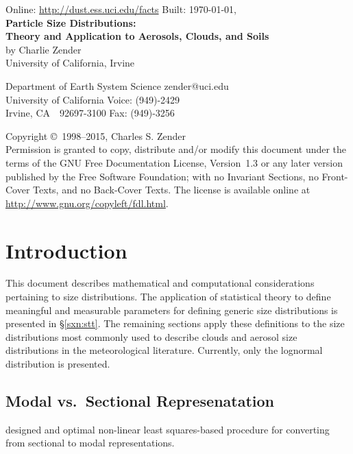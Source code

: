 \documentclass[12pt,twoside]{article}
\begin{document}

\begin{center}
Online: \url{http://dust.ess.uci.edu/facts} \hfill Built: \shortdate\today, \xxivtime\\
\bigskip
{\Large \textbf{Particle Size Distributions:\\ 
Theory and Application to Aerosols, Clouds, and Soils}}\\
\bigskip
by Charlie Zender\\
University of California, Irvine\\
\end{center}
Department of Earth System Science \hfill zender@uci.edu\\
University of California \hfill Voice: (949)-2429\\
Irvine, CA~~92697-3100 \hfill Fax: (949)-3256

\bigskip\noindent
Copyright \copyright\ 1998--2015,  Charles S. Zender\\
Permission is granted to copy, distribute and/or modify this document
under the terms of the GNU Free Documentation License, Version~1.3
or any later version published by the Free Software Foundation;
with no Invariant Sections, no Front-Cover Texts, and no Back-Cover
Texts.
The license is available online at
\url{http://www.gnu.org/copyleft/fdl.html}.

\setcounter{page}{1}
\pagestyle{headings}
\thispagestyle{empty}
\tableofcontents
\listoftables
{}
\setcounter{page}{1}
\thispagestyle{empty}

\section{Introduction}\label{sxn:ntr}

This document describes mathematical and computational considerations 
pertaining to size distributions.
The application of statistical theory to define meaningful and
measurable parameters for defining generic size distributions is
presented in \S\ref{sxn:stt}.
The remaining sections apply these definitions to the size
distributions most commonly used to describe clouds and aerosol size
distributions in the meteorological literature.
Currently, only the lognormal distribution is presented.

\subsection[Modal vs.\ Sectional Represenatation]{Modal vs.\ Sectional Represenatation}
\cite{LuB04} designed and optimal non-linear least squares-based
procedure for converting from sectional to modal representations.
\end{document}

